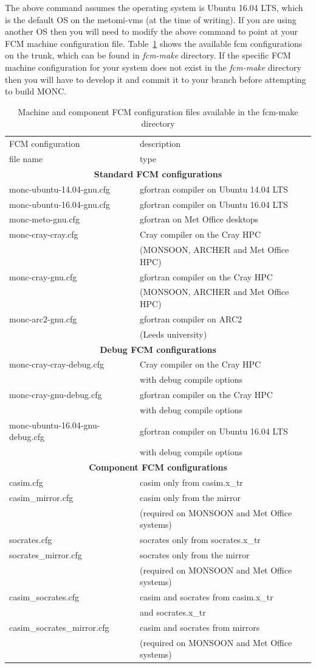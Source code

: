 \documentclass[a4paper,11pt]{article}
\begin{document}
The above command assumes the operating system is Ubuntu 16.04 LTS, which is
the default OS on the metomi-vms (at the time of writing). If you are using
another OS then you will need to modify the above command to point at your
FCM machine configuration file. Table~\ref{tab:fcm-configs} shows the available
fcm configurations on the trunk, which can be found in \emph{fcm-make} directory.
If the specific FCM machine configuration for your system does not exist in the
\emph{fcm-make} directory then you will have to develop it and commit it to your
branch before attempting to build MONC.

\begin{table}[H]
  \protect\caption{Machine and component FCM configuration files available
  in the fcm-make directory}
\label{tab:fcm-configs}
\begin{tabular}{|l|l|}
\hline
FCM configuration & description \tabularnewline
file name & type \tabularnewline
\hline
\multicolumn{2}{|c|}{\bf{Standard FCM configurations}} \tabularnewline
\hline
monc-ubuntu-14.04-gnu.cfg & gfortran compiler on Ubuntu 14.04 LTS \tabularnewline
\hline
monc-ubuntu-16.04-gnu.cfg & gfortran compiler on Ubuntu 16.04 LTS \tabularnewline
\hline
monc-meto-gnu.cfg         & gfortran on Met Office desktops \tabularnewline
\hline
monc-cray-cray.cfg        & Cray compiler on the Cray HPC \tabularnewline
  & (MONSOON, ARCHER and Met Office HPC) \tabularnewline
\hline
monc-cray-gnu.cfg         & gfortran compiler on the Cray HPC \tabularnewline
  & (MONSOON, ARCHER and Met Office HPC) \tabularnewline
\hline
monc-arc2-gnu.cfg         & gfortran compiler on ARC2  \tabularnewline
  & (Leeds university) \tabularnewline
\hline
\multicolumn{2}{|c|}{\bf{Debug FCM configurations}} \tabularnewline
\hline
monc-cray-cray-debug.cfg  & Cray compiler on the Cray HPC \tabularnewline
  & with debug compile options \tabularnewline
\hline
monc-cray-gnu-debug.cfg   & gfortran compiler on the Cray HPC \tabularnewline
  & with debug compile options \tabularnewline
\hline
monc-ubuntu-16.04-gnu-debug.cfg & gfortran compiler on Ubuntu 16.04 LTS \tabularnewline
  & with debug compile options \tabularnewline
\hline
\multicolumn{2}{|c|}{\bf{Component FCM configurations}} \tabularnewline
\hline
  casim.cfg  & casim only from casim.x\_tr \tabularnewline
  casim\_mirror.cfg & casim only from the mirror \tabularnewline
    &  (required on MONSOON and Met Office systems) \tabularnewline
\hline
  socrates.cfg  & socrates only from socrates.x\_tr \tabularnewline
  socrates\_mirror.cfg & socrates only from the mirror \tabularnewline
    &  (required on MONSOON and Met Office systems) \tabularnewline
\hline
  casim\_socrates.cfg & casim and socrates from casim.x\_tr \tabularnewline
    & and socrates.x\_tr \tabularnewline
  casim\_socrates\_mirror.cfg & casim and socrates from mirrors \tabularnewline
    & (required on MONSOON and Met Office systems) \tabularnewline
\hline
\hline
\end{tabular}
\end{table}
\end{document}
